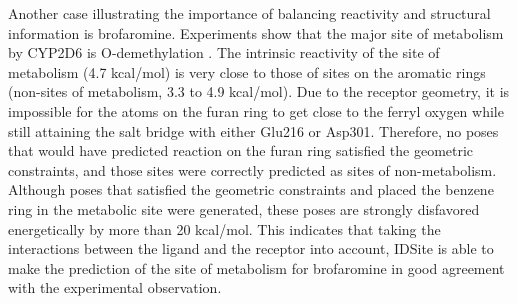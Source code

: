 Another case illustrating the importance of balancing reactivity and structural information is brofaromine.
Experiments show that the major site of metabolism by CYP2D6 is O-demethylation \cite{feifel1993role}.
The intrinsic reactivity of the site of metabolism (4.7 kcal/mol) is very close to those of sites on the aromatic rings (non-sites of metabolism, 3.3 to 4.9 kcal/mol).
Due to the receptor geometry, it is impossible for the atoms on the furan ring to get close to the ferryl oxygen while still attaining the salt bridge with either Glu216 or Asp301.
Therefore, no poses that would have predicted reaction on the furan ring satisfied the geometric constraints, and those sites were correctly predicted as sites of non-metabolism. 
Although poses that satisfied the geometric constraints and placed the benzene ring in the metabolic site were generated, these poses are strongly disfavored energetically by more than 20 kcal/mol. 
This indicates that taking the interactions between the ligand and the receptor into account, IDSite is able to make the prediction of the site of metabolism for brofaromine in good agreement with the experimental observation.

